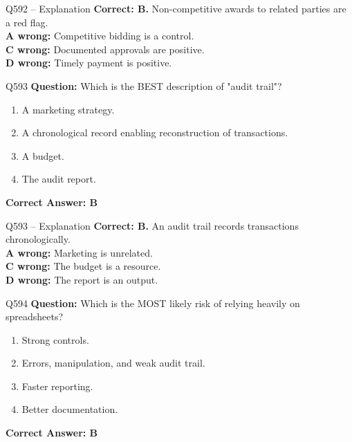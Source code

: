 \documentclass[aspectratio=169,10pt]{beamer}
\begin{document}
	\begin{frame}[t]{Q592 -- Explanation}
		\small
		\textbf{Correct: B.} Non-competitive awards to related parties are a red flag. \\[4pt]
		\textbf{A wrong:} Competitive bidding is a control. \\[2pt]
		\textbf{C wrong:} Documented approvals are positive. \\[2pt]
		\textbf{D wrong:} Timely payment is positive.
	\end{frame}
	
	\begin{frame}[t]{Q593}
		\small
		\textbf{Question:} Which is the BEST description of "audit trail"?
		\begin{enumerate}[label=\Alph*.,itemsep=1pt,topsep=2pt]
			\item A marketing strategy.
			\item A chronological record enabling reconstruction of transactions.
			\item A budget.
			\item The audit report.
		\end{enumerate}
		\vspace{4pt}
		\textbf{Correct Answer: B}
	\end{frame}
	
	\begin{frame}[t]{Q593 -- Explanation}
		\small
		\textbf{Correct: B.} An audit trail records transactions chronologically. \\[4pt]
		\textbf{A wrong:} Marketing is unrelated. \\[2pt]
		\textbf{C wrong:} The budget is a resource. \\[2pt]
		\textbf{D wrong:} The report is an output.
	\end{frame}
	
	\begin{frame}[t]{Q594}
		\small
		\textbf{Question:} Which is the MOST likely risk of relying heavily on spreadsheets?
		\begin{enumerate}[label=\Alph*.,itemsep=1pt,topsep=2pt]
			\item Strong controls.
			\item Errors, manipulation, and weak audit trail.
			\item Faster reporting.
			\item Better documentation.
		\end{enumerate}
		\vspace{4pt}
		\textbf{Correct Answer: B}
	\end{frame}
	
\end{document}
